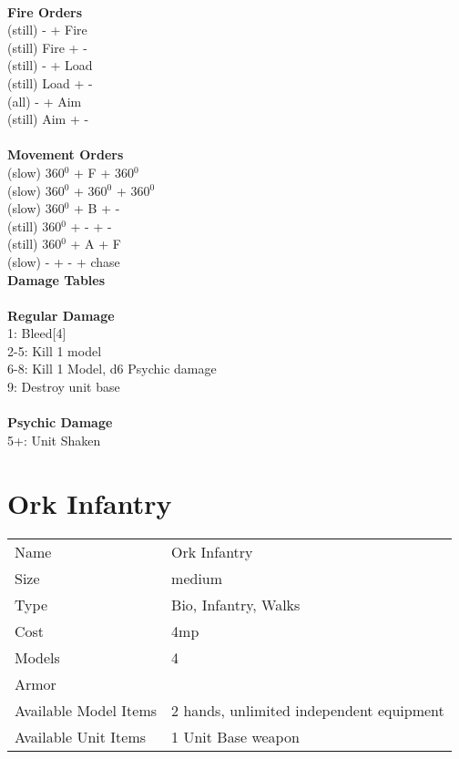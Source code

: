 \ \\ {\bf Fire Orders } \\
(still) - + Fire \\
(still) Fire + -  \\
(still) - + Load \\
(still) Load + - \\
(all) - + Aim \\
(still) Aim + -  \\
\ \\ {\bf Movement Orders } \\
(slow) 360$^0$ + F + 360$^0$ \\
(slow) 360$^0$ + 360$^0$ + 360$^0$ \\
(slow) 360$^0$ + B + - \\
(still) 360$^0$ + - + - \\
(still) 360$^0$ + A + F \\
(slow) - + - + chase \\



{\bf Damage Tables} \\
\ \\ {\bf Regular Damage } \\
1: Bleed[4] \\
2-5: Kill 1 model \\
6-8: Kill 1 Model, d6 Psychic damage \\
9: Destroy unit base \\
\ \\ {\bf Psychic Damage } \\
5+: Unit Shaken \\









\pagebreak

\section{ Ork Infantry }

\begin{tabular}{ll}
  Name & Ork Infantry \\
  Size & medium\\
  Type & Bio, Infantry, Walks\\
  Cost & 4mp\\
  Models & 4\\
  Armor & \\
  Available Model Items & 2 hands, unlimited independent equipment \\
  Available Unit Items & 1 Unit Base weapon \\
\end{tabular}


